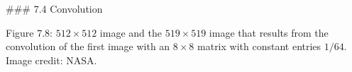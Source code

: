 

### 7.4 Convolution

Figure 7.8: \(512\times 512\) image and the \(519\times 519\) image that results from the convolution of the first image with an \(8\times 8\) matrix with constant entries \(1/64\). Image credit: NASA.

